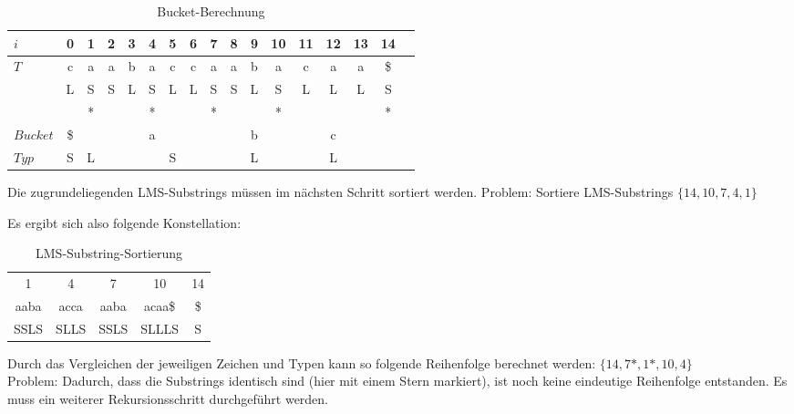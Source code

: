 \begin{table}[H]
\centering
  \begin{tabular}{ | l | c | c | c | c | c | c | c | c | c | c | c | c | c | c | c | c | }
    \hline
        $i$ & 0 & 1 & 2 & 3 & 4 & 5 & 6 & 7 & 8 & 9 & 10 & 11 & 12 & 13 & 14 \\ \hline
        $T$ & c & a & a & b & a & c & c & a & a & b & a & c & a & a & \$ \\ \hline
            & L & S & S & L & S & L & L & S & S & L & S & L & L & L & S \\ \hline
            &   & * &   &   & * &   &   & * &   &   & * &   &   &   & * \\ \hline
   $Bucket$ &\$ & \multicolumn{7}{c}{a} &   & \multicolumn{1}{c}{b} &   & \multicolumn{3}{c}{c} & \\ \hline
      $Typ$ & S & \multicolumn{1}{c}{L} &   & \multicolumn{5}{c}{S} &   & \multicolumn{1}{c}{L} &    & \multicolumn{3}{c}{L} &\\
    \hline
  \end{tabular}
  \caption{Bucket-Berechnung}
\end{table}
\bigskip

\noindent Die zugrundeliegenden LMS-Substrings müssen im nächsten Schritt sortiert werden. Problem: Sortiere LMS-Substrings $\{14, 10, 7, 4, 1\}$ \newpage

\noindent Es ergibt sich also folgende Konstellation:

\begin{table}[H]
\centering
	\begin{tabular}{c|c|c|c|c}
			 1 	     &            4          &          7            &           10            &          14 \\
          	aaba     &          acca         &        aaba           &          acaa\$         &          \$  \\
         	SSLS     &          SLLS         &        SSLS           &          SLLLS          &           S
	\end{tabular}
	\caption{LMS-Substring-Sortierung}
\end{table}
\bigskip

\noindent Durch das Vergleichen der jeweiligen Zeichen und Typen kann so folgende Reihenfolge berechnet werden: $\{14, 7*, 1*, 10, 4\}$ \\
\noindent Problem: Dadurch, dass die Substrings identisch sind (hier mit einem Stern markiert), ist noch keine eindeutige Reihenfolge entstanden. Es muss ein weiterer Rekursionsschritt durchgeführt werden.

